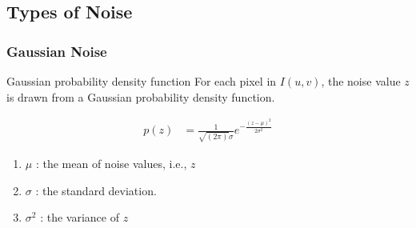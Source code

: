 \documentclass[english,11pt,table,handout]{beamer}
\begin{document}
\subsection{Types of Noise}
\frame
{
	\frametitle{Gaussian Noise}
	\begin{block}{Gaussian probability density function}
		For each pixel in $I(u,v)$, the noise value $z$ is drawn from a Gaussian probability density function.
		
		\begin{align}
		\nonumber
			p(z) &= \frac{1}{\sqrt{(2\pi)}\sigma}e^{-\frac{(z-\mu)^2}{2\sigma^2}}
		\end{align}
		\begin{enumerate}
			\item $\mu$ : the mean of noise values, i.e., $z$
			\item $\sigma$ : the standard deviation.
			\item $\sigma^2$ : the variance of $z$
		\end{enumerate}
		
	\end{block}

}
\end{document}
